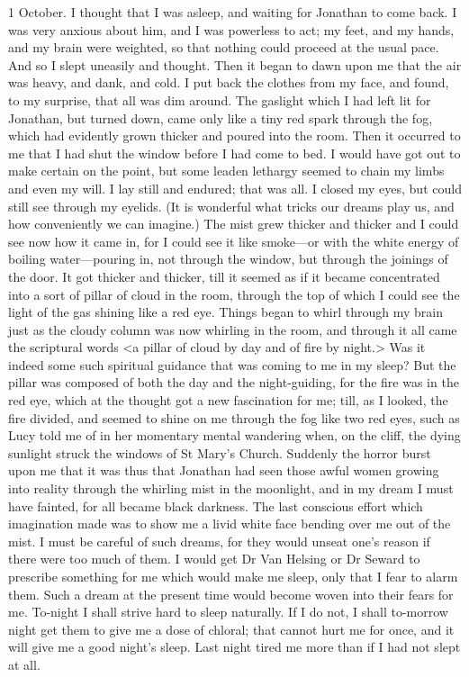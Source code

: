 \begin{diary}{1 October.}
I thought that I was asleep, and waiting for Jonathan to come back. I was very anxious about him, and I was powerless to act; my feet, and my hands, and my brain were weighted, so that nothing could proceed at the usual pace. And so I slept uneasily and thought. Then it began to dawn upon me that the air was heavy, and dank, and cold. I put back the clothes from my face, and found, to my surprise, that all was dim around. The gaslight which I had left lit for Jonathan, but turned down, came only like a tiny red spark through the fog, which had evidently grown thicker and poured into the room. Then it occurred to me that I had shut the window before I had come to bed. I would have got out to make certain on the point, but some leaden lethargy seemed to chain my limbs and even my will. I lay still and endured; that was all. I closed my eyes, but could still see through my eyelids. (It is wonderful what tricks our dreams play us, and how conveniently we can imagine.) The mist grew thicker and thicker and I could see now how it came in, for I could see it like smoke—or with the white energy of boiling water—pouring in, not through the window, but through the joinings of the door. It got thicker and thicker, till it seemed as if it became concentrated into a sort of pillar of cloud in the room, through the top of which I could see the light of the gas shining like a red eye. Things began to whirl through my brain just as the cloudy column was now whirling in the room, and through it all came the scriptural words <a pillar of cloud by day and of fire by night.> Was it indeed some such spiritual guidance that was coming to me in my sleep? But the pillar was composed of both the day and the night-guiding, for the fire was in the red eye, which at the thought got a new fascination for me; till, as I looked, the fire divided, and seemed to shine on me through the fog like two red eyes, such as Lucy told me of in her momentary mental wandering when, on the cliff, the dying sunlight struck the windows of St Mary's Church. Suddenly the horror burst upon me that it was thus that Jonathan had seen those awful women growing into reality through the whirling mist in the moonlight, and in my dream I must have fainted, for all became black darkness. The last conscious effort which imagination made was to show me a livid white face bending over me out of the mist. I must be careful of such dreams, for they would unseat one's reason if there were too much of them. I would get Dr Van Helsing or Dr Seward to prescribe something for me which would make me sleep, only that I fear to alarm them. Such a dream at the present time would become woven into their fears for me. To-night I shall strive hard to sleep naturally. If I do not, I shall to-morrow night get them to give me a dose of chloral; that cannot hurt me for once, and it will give me a good night's sleep. Last night tired me more than if I had not slept at all.
\end{diary}
 

